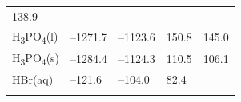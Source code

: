\documentclass[
  9pt,
]{extbook}
\theoremstyle{definition}
\theoremstyle{definition}
\theoremstyle{definition}
\theoremstyle{remark}
\begin{document}
\begin{longtable}[]{@{}lllll@{}}
\begin{minipage}[t]{0.18\columnwidth}
138.9\strut
\end{minipage}\tabularnewline
\begin{minipage}[t]{0.10\columnwidth}\raggedright
H\textsubscript{3}PO\textsubscript{4}(l)\strut
\end{minipage} & \begin{minipage}[t]{0.19\columnwidth}\raggedright
--1271.7\strut
\end{minipage} & \begin{minipage}[t]{0.20\columnwidth}\raggedright
--1123.6\strut
\end{minipage} & \begin{minipage}[t]{0.18\columnwidth}\raggedright
150.8\strut
\end{minipage} & \begin{minipage}[t]{0.18\columnwidth}\raggedright
145.0\strut
\end{minipage}\tabularnewline
\begin{minipage}[t]{0.10\columnwidth}\raggedright
H\textsubscript{3}PO\textsubscript{4}(s)\strut
\end{minipage} & \begin{minipage}[t]{0.19\columnwidth}\raggedright
--1284.4\strut
\end{minipage} & \begin{minipage}[t]{0.20\columnwidth}\raggedright
--1124.3\strut
\end{minipage} & \begin{minipage}[t]{0.18\columnwidth}\raggedright
110.5\strut
\end{minipage} & \begin{minipage}[t]{0.18\columnwidth}\raggedright
106.1\strut
\end{minipage}\tabularnewline
\begin{minipage}[t]{0.10\columnwidth}\raggedright
HBr(aq)\strut
\end{minipage} & \begin{minipage}[t]{0.19\columnwidth}\raggedright
--121.6\strut
\end{minipage} & \begin{minipage}[t]{0.20\columnwidth}\raggedright
--104.0\strut
\end{minipage} & \begin{minipage}[t]{0.18\columnwidth}\raggedright
82.4\strut
\end{minipage} & \begin{minipage}[t]{0.18\columnwidth}\raggedright
\strut
\end{minipage}\tabularnewline
\begin{minipage}[t]{0.10\columnwidth}\raggedright

\end{minipage}
\end{longtable}
\end{document}
